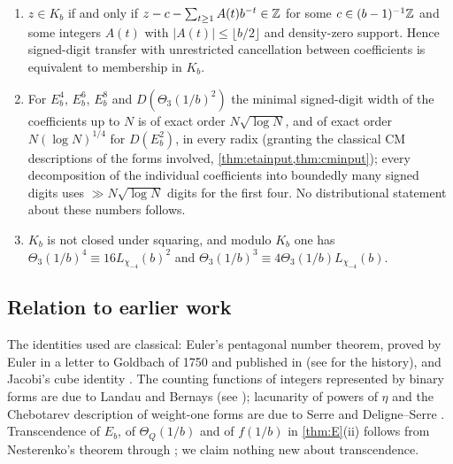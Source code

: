 \documentclass[11pt]{article}
\begin{document}
\begin{maintheorem}\label{thm:G}
\leavevmode
\begin{enumerate}[label=\textup{(\roman*)},nosep]
\item $z\in K_b$ if and only if $z-c-\sum_{t\ge1}A(t)b^{-t}\in\mathbb Z$ for some
$c\in(b-1)^{-1}\mathbb Z$ and some integers $A(t)$ with $|A(t)|\le\lfloor b/2\rfloor$ and
density-zero support. Hence signed-digit transfer with unrestricted
cancellation between coefficients is equivalent to membership in $K_b$.
\item For $E_b^4$, $E_b^6$, $E_b^8$ and $D(\Theta_3(1/b)^2)$ the minimal signed-digit
width of the coefficients up to $N$ is of exact order $N\sqrt{\log N}$, and of
exact order $N(\log N)^{1/4}$ for $D(E_b^2)$, in every radix (granting the classical
CM descriptions of the forms involved, \cref{thm:etainput,thm:cminput}); every decomposition of
the individual coefficients into boundedly many signed digits uses
$\gg N\sqrt{\log N}$ digits for the first four. No distributional statement about
these numbers follows.
\item $K_b$ is not closed under squaring, and modulo $K_b$ one has
$\Theta_3(1/b)^4\equiv16L_{\chi_{-4}}(b)^2$ and
$\Theta_3(1/b)^3\equiv4\Theta_3(1/b)L_{\chi_{-4}}(b)$.
\end{enumerate}
\end{maintheorem}

\subsection{Relation to earlier work}\label{subsec:literature}

The identities used are classical: Euler's pentagonal number theorem, proved by
Euler in a letter to Goldbach of 1750 and published in
\cite{EulerE244,EulerE541} (see \cite{Bell2005} for the history), and Jacobi's
cube identity \cite{Jacobi1829}. The counting functions of integers represented
by binary forms are due to Landau \cite{Landau1908} and Bernays \cite{Bernays1912}
(see \cite{BMO2011}); lacunarity of powers of $\eta$ and the Chebotarev
description of weight-one forms are due to Serre \cite{Serre1981,Serre1985} and
Deligne--Serre \cite{DeligneSerre1974}. Transcendence of $E_b$, of $\Theta_Q(1/b)$
and of $f(1/b)$ in \cref{thm:E}(ii) follows from Nesterenko's theorem
\cite{Nesterenko1996} through \cite{DNNS1996,Bertrand1997,HamiehMurty2016}; we
claim nothing new about transcendence.
\end{document}
